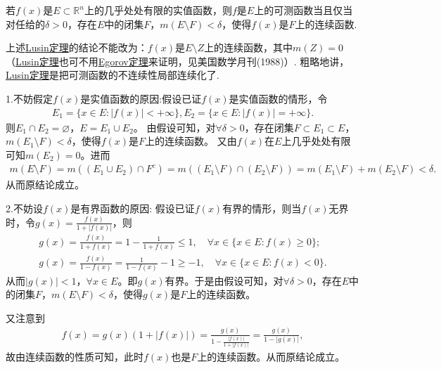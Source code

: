 \documentclass[../../main.tex]{subfiles}%
\begin{document}
\begin{theorem}[Lusin(卢津)定理]\label{theorem:Lusin(卢津)定理}
若\(f(x)\)是\(E \subset \mathbb{R}^{n}\)上的几乎处处有限的实值函数，则$f$是$E$上的可测函数当且仅当对任给的\(\delta > 0\)，存在\(E\)中的闭集\(F\)，\(m(E \setminus F) < \delta\)，使得\(f(x)\)是\(F\)上的连续函数.
\end{theorem}
\begin{remark}
上述\hyperref[theorem:Lusin(卢津)定理]{Lusin定理}的结论不能改为：\(f(x)\)是\(E \setminus Z\)上的连续函数，其中\(m(Z) = 0\)（\hyperref[theorem:Lusin(卢津)定理]{Lusin定理}也可不用\hyperref[theorem:Egorov定理]{Egorov定理}来证明，见美国数学月刊(1988)）. 粗略地讲，\hyperref[theorem:Lusin(卢津)定理]{Lusin定理}是把可测函数的不连续性局部连续化了. 
\end{remark}
\begin{remark}
1.\hypertarget{不妨假定f是实值函数的原因}{不妨假定}\(f(x)\)是实值函数的原因:假设已证\(f(x)\)是实值函数的情形，令
\begin{align*}
E_1 = \{x \in E : |f(x)| < +\infty\},E_2 = \{x \in E : |f(x)| = +\infty\}.
\end{align*}
则\(E_1 \cap E_2 = \varnothing\)，\(E = E_1 \cup E_2\)。
由假设可知，对\(\forall \delta > 0\)，存在闭集\(F \subset E_1 \subset E\)，\(m(E_1 \setminus F) < \delta\)，使得\(f(x)\)是\(F\)上的连续函数。
又由\(f(x)\)在\(E\)上几乎处处有限可知\(m(E_2) = 0\)。进而
\begin{align*}
m(E \setminus F) = m((E_1 \cup E_2) \cap F^c) 
= m((E_1 \setminus F) \cap (E_2 \setminus F)) 
= m(E_1 \setminus F) + m(E_2 \setminus F) 
< \delta.
\end{align*}
从而原结论成立。

2.\hypertarget{不妨设f有界的原因}{不妨设$f(x)$是有界函数的原因:} 假设已证\(f(x)\)有界的情形，则当\(f(x)\)无界时，令\(g(x) = \frac{f(x)}{1 + |f(x)|}\)，则
\begin{align*}
g(x) = \frac{f(x)}{1 + f(x)} = 1 - \frac{1}{1 + f(x)} \leqslant 1, \quad \forall x \in \{x \in E : f(x) \geqslant 0\}; \\
g(x) = \frac{f(x)}{1 - f(x)} = \frac{1}{1 - f(x)} - 1 \geqslant -1, \quad \forall x \in \{x \in E : f(x) < 0\}.
\end{align*}
从而\(|g(x)| < 1\)，\(\forall x \in E\)。即\(g(x)\)有界。于是由假设可知，对\(\forall \delta > 0\)，存在\(E\)中的闭集\(F\)，\(m(E \setminus F) < \delta\)，使得\(g(x)\)是\(F\)上的连续函数。

又注意到
\begin{align*}
f(x) = g(x)(1 + |f(x)|) = \frac{g(x)}{1 - \frac{|f(x)|}{1 + |f(x)|}} = \frac{g(x)}{1 - |g(x)|},
\end{align*}
故由连续函数的性质可知，此时\(f(x)\)也是\(F\)上的连续函数。从而原结论成立。
\end{remark}
\end{document}
